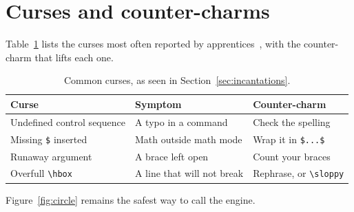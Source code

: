 \section{Curses and counter-charms}
\label{sec:curses}

Table~\ref{tab:curses} lists the curses most often reported by
apprentices~\cite{lamport}, with the counter-charm that lifts each one.

\begin{table}[h]
  \centering
  \begin{tabular}{@{}lll@{}}
    \toprule
    Curse & Symptom & Counter-charm \\
    \midrule
    Undefined control sequence & A typo in a command & Check the spelling \\
    Missing \verb|$| inserted & Math outside math mode & Wrap it in \verb|$...$| \\
    Runaway argument & A brace left open & Count your braces \\
    Overfull \verb|\hbox| & A line that will not break & Rephrase, or \verb|\sloppy| \\
    \bottomrule
  \end{tabular}
  \caption{Common curses, as seen in Section~\ref{sec:incantations}.}
  \label{tab:curses}
\end{table}

Figure~\ref{fig:circle} remains the safest way to call the engine.

